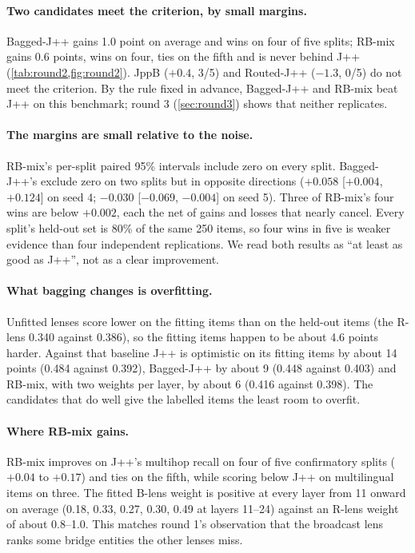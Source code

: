 \documentclass[11pt]{article}
\theoremstyle{definition}
\begin{document}
\paragraph{Two candidates meet the criterion, by small margins.} Bagged-J++ gains 1.0 point on
average and wins on four of five splits; RB-mix gains 0.6 points, wins on four, ties on the fifth and
is never behind J++ (\cref{tab:round2,fig:round2}). JppB ($+0.4$, 3/5) and Routed-J++ ($-1.3$, 0/5)
do not meet the criterion. By the rule fixed in advance, Bagged-J++ and RB-mix beat J++ on this
benchmark; round 3 (\cref{sec:round3}) shows that neither replicates.

\paragraph{The margins are small relative to the noise.} RB-mix's per-split paired 95\% intervals
include zero on every split. Bagged-J++'s exclude zero on two splits but in opposite directions
($+0.058$ [$+0.004$, $+0.124$] on seed 4; $-0.030$ [$-0.069$, $-0.004$] on seed 5). Three of RB-mix's
four wins are below $+0.002$, each the net of gains and losses that nearly cancel. Every split's
held-out set is 80\% of the same 250 items, so four wins in five is weaker evidence than four
independent replications. We read both results as ``at least as good as J++'', not as a clear
improvement.

\paragraph{What bagging changes is overfitting.} Unfitted lenses score lower on the fitting items than
on the held-out items (the R-lens 0.340 against 0.386), so the fitting items happen to be about 4.6
points harder. Against that baseline J++ is optimistic on its fitting items by about 14 points (0.484
against 0.392), Bagged-J++ by about 9 (0.448 against 0.403) and RB-mix, with two weights per layer, by
about 6 (0.416 against 0.398). The candidates that do well give the labelled items the least room to
overfit.

\paragraph{Where RB-mix gains.} RB-mix improves on J++'s multihop recall on four of five confirmatory
splits ($+0.04$ to $+0.17$) and ties on the fifth, while scoring below J++ on multilingual items on
three. The fitted B-lens weight is positive at every layer from 11 onward on average (0.18, 0.33, 0.27,
0.30, 0.49 at layers 11--24) against an R-lens weight of about 0.8--1.0. This matches round 1's
observation that the broadcast lens ranks some bridge entities the other lenses miss.
\end{document}
